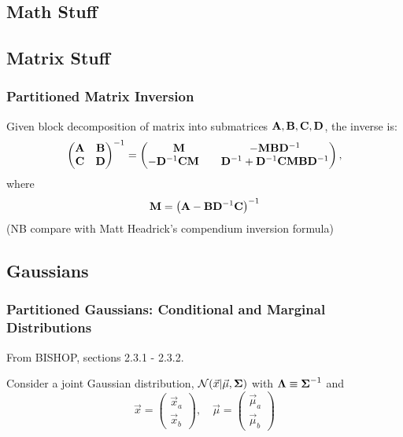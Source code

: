 \documentclass[11pt]{article}
\begin{document}
\newpage
\begin{appendices}
  \section{Math Stuff}

  \subsection{Matrix Stuff}
  \subsubsection{Partitioned Matrix Inversion}
  Given block decomposition of matrix into submatrices
  $\mathbf{A}, \mathbf{B}, \mathbf{C}, \mathbf{D}$, the inverse is:
  \begin{equation}
    \left(
      \begin{matrix}
        \mathbf{A} & \mathbf{B} \\
        \mathbf{C} & \mathbf{D}
      \end{matrix}
    \right)^{-1}
    =
    \left(
      \begin{matrix}
        \mathbf{M} & - \mathbf{M} \mathbf{B} \mathbf{D}^{-1} \\
        - \mathbf{D}^{-1} \mathbf{C} \mathbf{M} \quad & \mathbf{D}^{-1} + \mathbf{D}^{-1} \mathbf{C} \mathbf{M} \mathbf{B} \mathbf{D}^{-1}
      \end{matrix}
    \right),
  \end{equation}
  where
  \begin{equation}
    \mathbf{M} = \left(\mathbf{A} - \mathbf{B} \mathbf{D}^{-1} \mathbf{C} \right)^{-1}
  \end{equation}
  (NB compare with Matt Headrick's compendium inversion formula)


\subsection{Gaussians}
\subsubsection{Partitioned Gaussians: Conditional and Marginal Distributions}
From BISHOP, sections 2.3.1 - 2.3.2.

Consider a joint Gaussian distribution, $\mathcal{N}(\vec{x} | \vec{\mu}, \boldsymbol{\Sigma})$ with
$\boldsymbol{\Lambda} \equiv \boldsymbol{\Sigma}^{-1}$ and
\begin{equation}
  \vec{x} =
  \left(
    \begin{matrix}
      \vec{x}_a \\
      \vec{x}_b
    \end{matrix}
  \right)
  , \quad
  \vec{\mu} =
  \left(
    \begin{matrix}
      \vec{\mu}_a \\
      \vec{\mu}_b
    \end{matrix}
  \right)
\end{equation}


\end{appendices}
\end{document}
